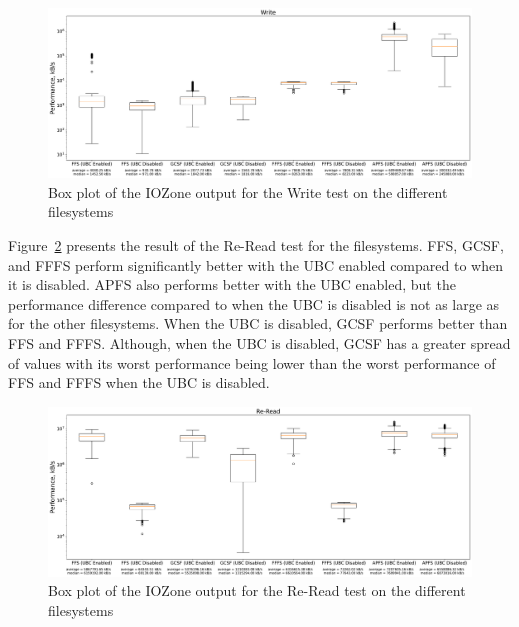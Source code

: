 \begin{figure}[!ht]
	\label{fig:res_box_write}
	\begin{center}
		\includegraphics[width=1.0\textwidth]{figures.nosync/benchmarking/Write-boxplot.pdf}
	\end{center}
	\caption{Box plot of the IOZone output for the Write test on the different filesystems}
\end{figure}

\FloatBarrier

Figure~\ref{fig:res_box_reread} presents the result of the \mbox{Re-Read} test for the filesystems. \gls{FFS}, \gls{GCSF}, and \gls{FFFS} perform significantly better with the \gls{UBC} enabled compared to when it is disabled. \gls{APFS} also performs better with the \gls{UBC} enabled, but the performance difference compared to when the \gls{UBC} is disabled is not as large as for the other filesystems. When the \gls{UBC} is disabled, \gls{GCSF} performs better than \gls{FFS} and \gls{FFFS}. Although, when the \gls{UBC} is disabled, \gls{GCSF} has a greater spread of values with its worst performance being lower than the worst performance of \gls{FFS} and \gls{FFFS} when the \gls{UBC} is disabled.

\begin{figure}[!ht]
	\label{fig:res_box_reread}
	\begin{center}
		\includegraphics[width=1.0\textwidth]{figures.nosync/benchmarking/Re-Read-boxplot.pdf}
	\end{center}
	\caption{Box plot of the IOZone output for the Re-Read test on the different filesystems}
\end{figure}

